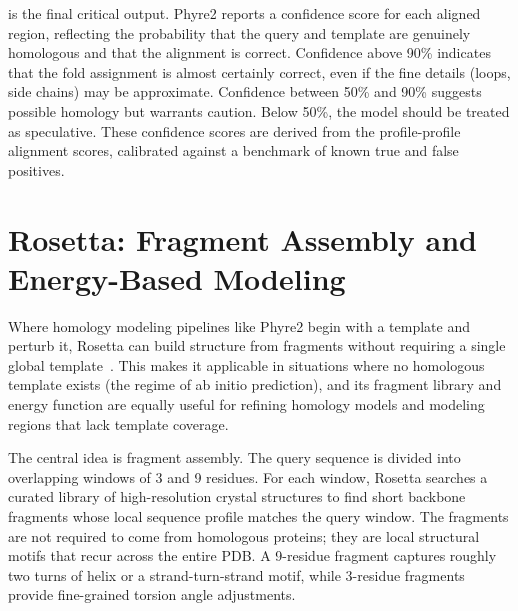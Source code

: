  is the final critical output. Phyre2 reports a confidence score for each aligned region, reflecting the probability that the query and template are genuinely homologous and that the alignment is correct. Confidence above 90\% indicates that the fold assignment is almost certainly correct, even if the fine details (loops, side chains) may be approximate. Confidence between 50\% and 90\% suggests possible homology but warrants caution. Below 50\%, the model should be treated as speculative. These confidence scores are derived from the profile-profile alignment scores, calibrated against a benchmark of known true and false positives.

\section{Rosetta: Fragment Assembly and Energy-Based Modeling}
\label{sec:rosetta}

 Where homology modeling pipelines like Phyre2 begin with a template and perturb it, Rosetta can build structure from fragments without requiring a single global template~\cite{simons1997}. This makes it applicable in situations where no homologous template exists (the regime of ab initio prediction), and its fragment library and energy function are equally useful for refining homology models and modeling regions that lack template coverage.

The central idea is fragment assembly. The query sequence is divided into overlapping windows of 3 and 9 residues. For each window, Rosetta searches a curated library of high-resolution crystal structures to find short backbone fragments whose local sequence profile matches the query window. The fragments are not required to come from homologous proteins; they are local structural motifs that recur across the entire PDB. A 9-residue fragment captures roughly two turns of helix or a strand-turn-strand motif, while 3-residue fragments provide fine-grained torsion angle adjustments.

